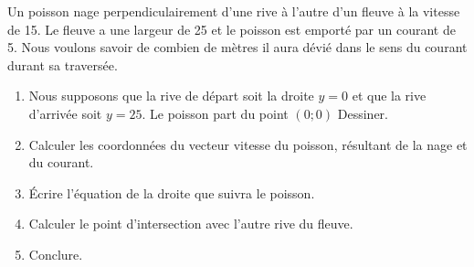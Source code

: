 
\begin{exercice}\label{exosmath-0186}

            Un poisson nage perpendiculairement d'une rive à l'autre d'un fleuve à la vitesse de \unit{15}{\kilo\meter\per\hour}. Le fleuve a une largeur de \unit{25}{\meter} et le poisson est emporté par un courant de \unit{5}{\kilo\meter\per\hour}. Nous voulons savoir de combien de mètres il aura dévié dans le sens du courant durant sa traversée.
            \begin{enumerate}
                \item
                    Nous supposons que la rive de départ soit la droite \( y=0\) et que la rive d'arrivée soit \( y=25\). Le poisson part du point \( (0;0)\) Dessiner.
                \item
                    Calculer les coordonnées du vecteur vitesse du poisson, résultant de la nage et du courant.
                \item
                    Écrire l'équation de la droite que suivra le poisson.
                \item
                    Calculer le point d'intersection avec l'autre rive du fleuve.
                \item
                    Conclure.
            \end{enumerate}

\end{exercice}
